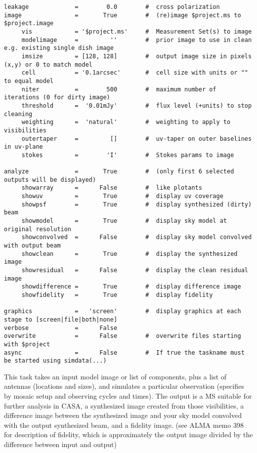 \begin{verbatim}
leakage             =        0.0        #  cross polarization
image               =       True        #  (re)image $project.ms to $project.image
     vis            = '$project.ms'     #  Measurement Set(s) to image
     modelimage     =         ''        #  prior image to use in clean e.g. existing single dish image
     imsize         = [128, 128]        #  output image size in pixels (x,y) or 0 to match model
     cell           = '0.1arcsec'       #  cell size with units or "" to equal model
     niter          =        500        #  maximum number of iterations (0 for dirty image)
     threshold      =  '0.01mJy'        #  flux level (+units) to stop cleaning
     weighting      =  'natural'        #  weighting to apply to visibilities
     outertaper     =         []        #  uv-taper on outer baselines in uv-plane
     stokes         =        'I'        #  Stokes params to image

analyze             =       True        #  (only first 6 selected outputs will be displayed)
     showarray      =      False        #  like plotants
     showuv         =       True        #  display uv coverage
     showpsf        =       True        #  display synthesized (dirty) beam
     showmodel      =       True        #  display sky model at original resolution
     showconvolved  =      False        #  display sky model convolved with output beam
     showclean      =       True        #  display the synthesized image
     showresidual   =      False        #  display the clean residual image
     showdifference =       True        #  display difference image
     showfidelity   =       True        #  display fidelity

graphics            =   'screen'        #  display graphics at each stage to [screen|file|both|none]
verbose             =      False        
overwrite           =      False        #  overwrite files starting with $project
async               =      False        #  If true the taskname must be started using simdata(...)
\end{verbatim}
\normalsize

This task takes an input model image or list of components, plus a
list of antennas (locations and sizes), and simulates a particular
observation (specifies by mosaic setup and observing cycles and
times).  The output is a MS suitable for further analysis in CASA, a
synthesized image created from those visibilities, a difference image
between the synthesized image and your sky model convolved with the
output synthesized beam, and a fidelity image. (see ALMA memo 398 for
description of fidelity, which is approximately the output image
divided by the difference between input and output)

